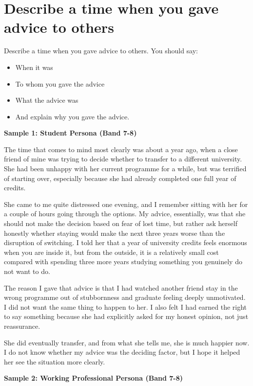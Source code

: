 \section{Describe a time when you gave advice to others}
\begin{ieltsprompt}
Describe a time when you gave advice to others.
You should say:
\begin{itemize}[leftmargin=2em, itemsep=2pt]
\item When it was
\item To whom you gave the advice
\item What the advice was
\item And explain why you gave the advice.
\end{itemize}
\end{ieltsprompt}
\begin{ieltsanswer}
\textbf{Sample 1: Student Persona (Band 7-8)}

The time that comes to mind most clearly was about a year ago, when a close friend of mine was trying to decide whether to transfer to a different university. She had been unhappy with her current programme for a while, but was terrified of starting over, especially because she had already completed one full year of credits.

She came to me quite distressed one evening, and I remember sitting with her for a couple of hours going through the options. My advice, essentially, was that she should not make the decision based on fear of lost time, but rather ask herself honestly whether staying would make the next three years worse than the disruption of switching. I told her that a year of university credits feels enormous when you are inside it, but from the outside, it is a relatively small cost compared with spending three more years studying something you genuinely do not want to do.

The reason I gave that advice is that I had watched another friend stay in the wrong programme out of stubbornness and graduate feeling deeply unmotivated. I did not want the same thing to happen to her. I also felt I had earned the right to say something because she had explicitly asked for my honest opinion, not just reassurance.

She did eventually transfer, and from what she tells me, she is much happier now. I do not know whether my advice was the deciding factor, but I hope it helped her see the situation more clearly.

\textbf{Sample 2: Working Professional Persona (Band 7-8)}


\end{ieltsanswer}
